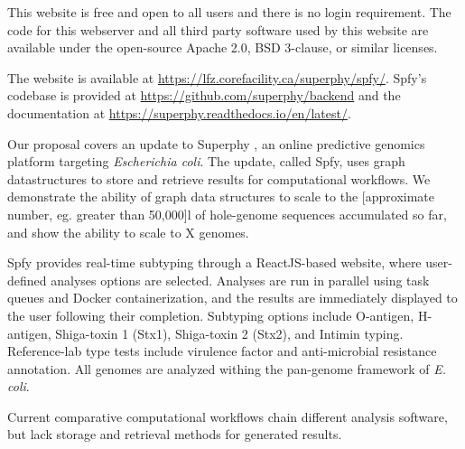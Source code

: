 


This website is free and open to all users and there is no login requirement. The code for this webserver and all third party software used by this website are available under the open-source Apache 2.0, BSD 3-clause, or similar licenses.

The website is available at \url{https://lfz.corefacility.ca/superphy/spfy/}. Spfy's codebase is provided at \url{https://github.com/superphy/backend} and the documentation at \url{https://superphy.readthedocs.io/en/latest/}.

Our proposal covers an update to Superphy \citep{whiteside2016superphy}, an online predictive genomics platform targeting \textit{Escherichia coli}.
The update, called Spfy, uses graph datastructures to store and retrieve results for computational workflows.
We demonstrate the ability of graph data structures to scale to the [approximate number, eg. greater than 50,000]l of hole-genome sequences  accumulated so far, and show the ability to scale to X genomes.

Spfy provides real-time subtyping through a ReactJS-based website, where user-defined analyses options are selected. Analyses are run in parallel using task queues and Docker containerization, and the results are immediately displayed to the user following their completion.
Subtyping options include O-antigen, H-antigen, Shiga-toxin 1 (Stx1), Shiga-toxin 2 (Stx2), and Intimin typing. Reference-lab type tests include virulence factor and anti-microbial resistance annotation. All genomes are analyzed withing the pan-genome framework of \textit{E. coli}.



Current comparative computational workflows chain different analysis software, but lack storage and retrieval methods for generated results.

